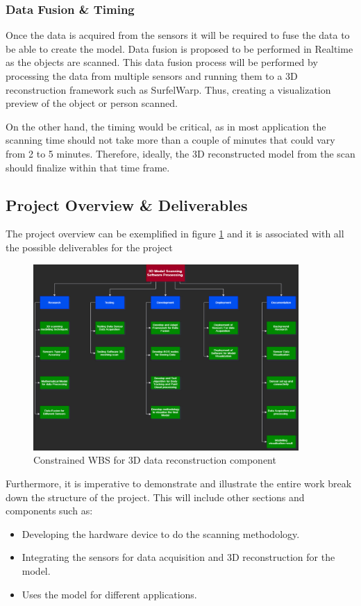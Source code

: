 \documentclass[12pt]{report}
\begin{document}
\subsubsection{Data Fusion \& Timing}
Once the data is acquired from the sensors it will be required to fuse the data to be able to create the model.
 Data fusion is proposed to be performed in Realtime as the objects are scanned. This data fusion process will be performed by processing the data from multiple sensors and running them to a 3D reconstruction framework such as SurfelWarp. 
Thus, creating a visualization preview of the object or person scanned. 

On the other hand, the timing would be critical, as in most application the scanning time should not take more than a couple of minutes that could vary from 2 to 5 minutes.
Therefore, ideally, the 3D reconstructed model from the scan should finalize within that time frame.

\subsection{Project Overview \& Deliverables}
The project overview can be exemplified in figure \ref{fig:ConstrainedWBS} and it is associated with all the possible deliverables for the project
\begin{figure}[ht]
  \centering
  \includegraphics[width=0.9\textwidth]{ConstrainedWBS.png}
  \caption{Constrained WBS for 3D data reconstruction component}
  \label{fig:ConstrainedWBS}
\end{figure}

Furthermore, it is imperative to demonstrate and illustrate the entire work break down the structure of the project. This will include other sections and components such as: 
\begin{itemize}
  \item Developing the hardware device to do the scanning methodology. 
  \item Integrating the sensors for data acquisition and 3D reconstruction for the model.
  \item Uses the model for different applications. 
\end{itemize}
\end{document}
